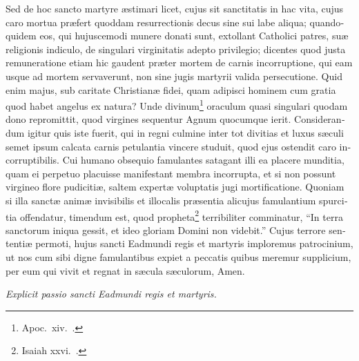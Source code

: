 \documentclass[10pt]{book}
\begin{document}
\begin{paracol}{2}
\begin{otherlanguage}{latin}
Sed de hoc sancto martyre \ae{}stimari licet, cujus sit sanctitatis in hac vita, cujus caro mortua pr\ae{}fert quoddam resurrectionis decus sine sui labe aliqua; quandoquidem eos, qui hujuscemodi munere donati sunt, extollant Catholici patres, su\ae{} religionis indiculo, de singulari virginitatis adepto privilegio; dicentes quod justa remuneratione etiam hic gaudent pr\ae{}ter mortem de carnis incorruptione, qui eam usque ad mortem servaverunt, non sine jugis martyrii valida persecutione. Quid enim majus, sub caritate Christian\ae{} fidei, quam adipisci hominem cum gratia quod habet angelus ex natura? Unde divinum\footnote{Apoc.\ xiv.\ .} oraculum quasi singulari quodam dono repromittit, quod virgines sequentur Agnum quocumque ierit. Considerandum igitur quis iste fuerit, qui in regni culmine inter tot divitias et luxus s\ae{}culi semet ipsum calcata carnis petulantia vincere studuit, quod ejus ostendit caro incorruptibilis. Cui humano obsequio famulantes satagant illi ea placere munditia, quam ei perpetuo placuisse manifestant membra incorrupta, et si non possunt virgineo flore pudiciti\ae{}, saltem expert\ae{} voluptatis jugi mortificatione. Quoniam si illa sanct\ae{} anim\ae{} invisibilis et illocalis pr\ae{}sentia alicujus famulantium spurcitia offendatur, timendum est, quod propheta\footnote{Isaiah xxvi.\ .} terribiliter comminatur, ``In terra sanctorum iniqua gessit, et ideo gloriam Domini non videbit.'' Cujus terrore sententi\ae{} permoti, hujus sancti Eadmundi regis et martyris imploremus patrocinium, ut nos cum sibi digne famulantibus expiet a peccatis quibus meremur supplicium, per eum qui vivit et regnat in s\ae{}cula s\ae{}culorum, Amen.

\vspace{-.3cm}
\begin{center}
\parbox{4cm}{\footnotesize\emph{Explicit passio sancti Eadmundi regis et martyris.}}
\end{center}

\end{otherlanguage}

\switchcolumn


\end{paracol}
\end{document}

